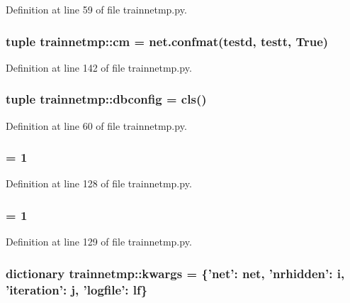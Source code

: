 Definition at line 59 of file trainnetmp.py.

\hypertarget{namespacetrainnetmp_af36e6597c6ab86263c1f5da739583e3f}{
\subsubsection[{cm}]{\setlength{\rightskip}{0pt plus 5cm}tuple {\bf trainnetmp::cm} = net.confmat(testd, testt, True)}}
\label{namespacetrainnetmp_af36e6597c6ab86263c1f5da739583e3f}


Definition at line 142 of file trainnetmp.py.

\hypertarget{namespacetrainnetmp_a5b13bd831f315c6820696cabf93a0d85}{
\subsubsection[{dbconfig}]{\setlength{\rightskip}{0pt plus 5cm}tuple {\bf trainnetmp::dbconfig} = {\bf cls}()}}
\label{namespacetrainnetmp_a5b13bd831f315c6820696cabf93a0d85}


Definition at line 60 of file trainnetmp.py.

\hypertarget{namespacetrainnetmp_aa4405feef7b967d4eb9749579d3b1dad}{
\subsubsection[{jmax}]{ = 1}}
\label{namespacetrainnetmp_aa4405feef7b967d4eb9749579d3b1dad}


Definition at line 128 of file trainnetmp.py.

\hypertarget{namespacetrainnetmp_a8c5a189bb47054d719066421ae589642}{
\subsubsection[{kmax}]{ = 1}}
\label{namespacetrainnetmp_a8c5a189bb47054d719066421ae589642}


Definition at line 129 of file trainnetmp.py.

\hypertarget{namespacetrainnetmp_afecb97f9f28c04c9cce1e3342010cd53}{
\subsubsection[{kwargs}]{\setlength{\rightskip}{0pt plus 5cm}dictionary {\bf trainnetmp::kwargs} = \{'{\bf net}': {\bf net}, 'nrhidden': i, 'iteration': j, 'logfile': {\bf lf}\}}}
\label{namespacetrainnetmp_afecb97f9f28c04c9cce1e3342010cd53}


